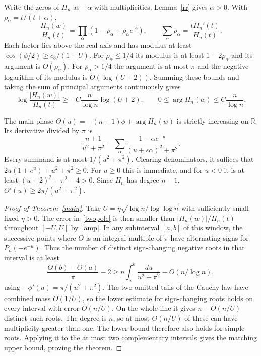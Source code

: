 \documentclass[11pt]{article}
\newcommand{\ii}{\mathrm{i}}
\begin{document}
Write the zeros of $H_n$ as $-\alpha$ with multiplicities. Lemma~\ref{rr} gives $\alpha>0$. With $\rho_\alpha=t/(t+\alpha)$,
\[
 \frac{H_n(w)}{H_n(t)}
   =\prod_\alpha(1-\rho_\alpha+\rho_\alpha e^{\ii\phi}),\qquad
 \sum_\alpha\rho_\alpha=\frac{tH_n'(t)}{H_n(t)}.
\]
Each factor lies above the real axis and has modulus at least $\cos(\phi/2)\ge c_3/(1+U)$. For $\rho_\alpha\le1/4$ its modulus is at least $1-2\rho_\alpha$ and its argument is $O(\rho_\alpha)$. For $\rho_\alpha>1/4$ the argument is at most $\pi$ and the negative logarithm of its modulus is $O(\log(U+2))$. Summing these bounds and taking the sum of principal arguments continuously gives
\begin{equation}\label{amp}
 \log\frac{|H_n(w)|}{H_n(t)}
 \ge -C\frac{n}{\log n}\log(U+2),\qquad
 0\le\arg H_n(w)\le C\frac{n}{\log n}.
\end{equation}

The main phase $\Theta(u)=-(n+1)\phi+\arg H_n(w)$ is strictly increasing on $\mathbb R$. Its derivative divided by $\pi$ is
\[
 \frac{n+1}{u^2+\pi^2}-
 \sum_\alpha\frac{1-\alpha e^{-u}}{(u+s\alpha)^2+\pi^2}.
\]
Every summand is at most $1/(u^2+\pi^2)$. Clearing denominators, it suffices that $2u(1+e^u)+u^2+\pi^2\ge0$. For $u\ge0$ this is immediate, and for $u<0$ it is at least $(u+2)^2+\pi^2-4>0$. Since $H_n$ has degree $n-1$, $\Theta'(u)\ge2\pi/(u^2+\pi^2)$.

\begin{proof}[Proof of Theorem~\ref{main}]
Take $U=\eta\sqrt{\log n/\log\log n}$ with sufficiently small fixed $\eta>0$. The error in~\eqref{twopole} is then smaller than $|H_n(w)|/H_n(t)$ throughout $[-U,U]$ by~\eqref{amp}. In any subinterval $[a,b]$ of this window, the successive points where $\Theta$ is an integral multiple of $\pi$ have alternating signs for $P_n(-e^{-u})$. Thus the number of distinct sign-changing negative roots in that interval is at least
\[
 \frac{\Theta(b)-\Theta(a)}{\pi}-2
 \ge n\int_a^b\frac{du}{u^2+\pi^2}-O(n/\log n),
\]
using $-\phi'(u)=\pi/(u^2+\pi^2)$. The two omitted tails of the Cauchy law have combined mass $O(1/U)$, so the lower estimate for sign-changing roots holds on every interval with error $O(n/U)$. On the whole line it gives $n-O(n/U)$ distinct such roots. The degree is $n$, so at most $O(n/U)$ of these can have multiplicity greater than one. The lower bound therefore also holds for simple roots. Applying it to the at most two complementary intervals gives the matching upper bound, proving the theorem.
\end{proof}
\end{document}
